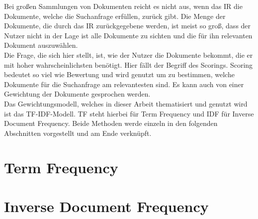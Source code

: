 Bei großen Sammlungen von Dokumenten reicht es nicht aus, wenn das IR die Dokumente, welche die Suchanfrage erfüllen, zurück gibt. Die Menge der Dokumente, die durch das IR zurückgegebene werden, ist meist so groß, dass der Nutzer nicht in der Lage ist alle Dokumente zu sichten und die für ihn relevanten Dokument auszuwählen.\\
Die Frage, die sich hier stellt, ist, wie der Nutzer die Dokumente bekommt, die er mit hoher wahrscheinlichsten benötigt. Hier fällt der Begriff des Scorings. Scoring bedeutet so viel wie Bewertung und wird genutzt um zu bestimmen, welche Dokumente für die Suchanfrage am relevantesten sind. Es kann auch von einer Gewichtung der Dokumente gesprochen werden.\\
Das Gewichtungsmodell, welches in dieser Arbeit thematisiert und genutzt wird ist das TF-IDF-Modell. TF steht hierbei für Term Frequency und IDF für Inverse Document Frequency. Beide Methoden werde einzeln in den folgenden Abschnitten vorgestellt und am Ende verknüpft.

\section{Term Frequency}

\section{Inverse Document Frequency}